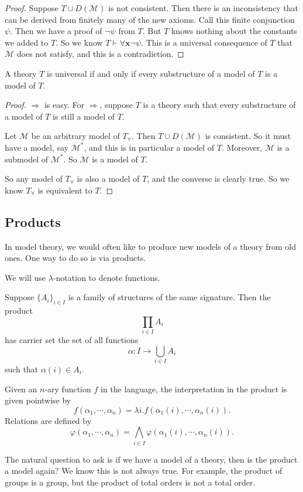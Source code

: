\documentclass[a4paper]{article}
\begin{document}
\begin{proof}
  Suppose $T \cup D(\mathcal{M})$ is not consistent. Then there is an inconsistency that can be derived from finitely many of the new axioms. Call this finite conjunction $\psi$. Then we have a proof of $\neg \psi$ from $T$. But $T$ knows nothing about the constants we added to $T$. So we know $T\vdash \forall \mathbf{x} \neg \psi$. This is a universal consequence of $T$ that $\mathcal{M}$ does not satisfy, and this is a contradiction.
\end{proof}

\begin{thm}
  A theory $T$ is universal if and only if every substructure of a model of $T$ is a model of $T$.
\end{thm}

\begin{proof}
  $\Rightarrow$ is easy. For $\Rightarrow$, suppose $T$ is a theory such that every substructure of a model of $T$ is still a model of $T$.

  Let $\mathcal{M}$ be an arbitrary model of $T_\forall$. Then $T \cup D(\mathcal{M})$ is consistent. So it must have a model, say $\mathcal{M}^*$, and this is in particular a model of $T$. Moreover, $\mathcal{M}$ is a submodel of $\mathcal{M}^*$. So $\mathcal{M}$ is a model of $T$.

  So any model of $T_{\forall}$ is also a model of $T$, and the converse is clearly true. So we know $T_{\forall}$ is equivalent to $T$.
\end{proof}

\subsection{Products}
In model theory, we would often like to produce new models of a theory from old ones. One way to do so is via products.

We will use $\lambda$-notation to denote functions.
\begin{defi}
  Suppose $\{A_i\}_{i \in I}$ is a family of structures of the same signature. Then the product
  \[
    \prod_{i \in I} A_i
  \]
  has carrier set the set of all functions
  \[
    \alpha: I \to \bigcup_{i \in I} A_i
  \]
  such that $\alpha(i) \in A_i$.

  Given an $n$-ary function $f$ in the language, the interpretation in the product is given pointwise by
  \[
    f(\alpha_1, \cdots, \alpha_n) = \lambda i. f(\alpha_1(i), \cdots, \alpha_n(i)).
  \]
  Relations are defined by
  \[
    \varphi(\alpha_1, \cdots, \alpha_n) = \bigwedge_{i \in I} \varphi(\alpha_1(i), \cdots, \alpha_n(i)).
  \]
\end{defi}
The natural question to ask is if we have a model of a theory, then is the product a model again? We know this is not always true. For example, the product of groups is a group, but the product of total orders is not a total order.
\end{document}
